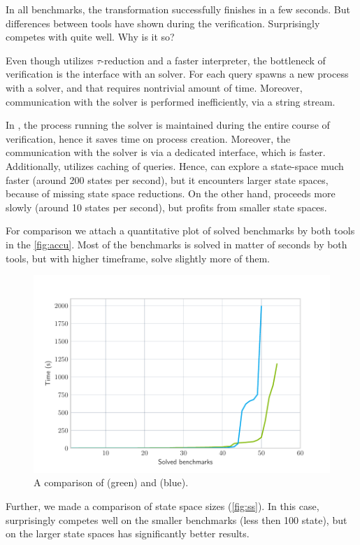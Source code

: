 In all benchmarks, the transformation successfully finishes in a few seconds.
But differences between tools have shown during the verification. Surprisingly
\SymDIVINE competes with \DIVINE quite well. Why is it so?

Even though \DIVINE utilizes $\tau$-reduction and a faster \LLVM interpreter,
the bottleneck of verification is the interface with an \SMT solver. For each
\SMT query \DIVINE spawns a new process with a solver, and that requires
nontrivial amount of time. Moreover, communication with the solver is
performed inefficiently, via a string stream.

In \SymDIVINE, the process running the \SMT solver is maintained during the
entire course of verification, hence it saves time on process creation.
Moreover, the communication with the solver is via a dedicated interface,
which is faster. Additionally, \SymDIVINE utilizes caching of queries.
Hence, \SymDIVINE can explore a state-space much faster (around 200 states
per second), but it encounters larger state spaces, because of missing state
space reductions. On the other hand, \DIVINE proceeds more slowly (around 10
states per second), but profits from smaller state spaces.


For comparison we attach a quantitative plot of solved benchmarks by both tools
in the \autoref{fig:accu}.
Most of the benchmarks is solved in matter of seconds by both tools, but with
higher timeframe, \DIVINE solve slightly more of them.

\begin{figure}
\includegraphics[width=\textwidth]{img/accum.pdf}
    \caption{A comparison of \DIVINE (green) and \SymDIVINE (blue).}
    \label{fig:accu}
\end{figure}
Further, we made a comparison of state space sizes (\autoref{fig:ss}). In this case, \SymDIVINE
surprisingly competes well on the smaller benchmarks (less then 100 state), but
on the larger state spaces \DIVINE has significantly better results.

